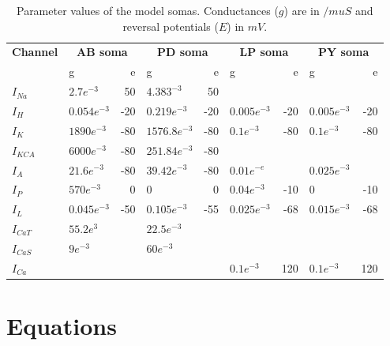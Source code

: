 \begin{table}[H]
	\centering
	\tiny
	\caption{Parameter values of the model somas. Conductances ($g$) are in $/mu S$ and reversal potentials ($E$) in $mV$.}
	\label{tab:addlabel}%
	\begin{tabular}{llrlrlrlr}
		\hline
		\bf Channel & \multicolumn{2}{c}{\bf AB soma} & \multicolumn{2}{c}{\bf PD soma} & \multicolumn{2}{c}{\bf LP soma} & \multicolumn{2}{c}{\bf PY soma} \\
		 & g & e & g & e & g & e & g & e \\
		\hline
		$I_{Na}$  & $2.7e^{-3}$ & 50 \vline& $4.383^{-3}$ & 50 \vline& \centering\textemdash & \textemdash \vline& \textemdash & \textemdash \\
		$I_{H}$  & $0.054e^{-3}$ & -20 \vline& $0.219e^{-3}$ & -20 \vline& $0.005e^{-3}$ & -20 \vline& $0.005e^{-3}$ & -20 \\
		$I_{K}$  & $1890e^{-3}$ & -80 \vline& $1576.8e^{-3}$ & -80 \vline& $0.1e^{-3}$ & -80  \vline & $0.1e^{-3}$ & -80 \\
		$I_{KCA}$ & $6000e^{-3}$ & -80 \vline& $251.84e^{-3}$ & -80 \vline& \centering\textemdash & \textemdash \vline& \centering\textemdash &  \textemdash \\
		$I_{A}$  & $21.6e^{-3}$ & -80 \vline& $39.42e^{-3}$ & -80 \vline& $0.01e^{-e}$ & \textemdash \vline& $0.025e^{-3}$ & \textemdash \\
		$I_{P}$  & $570e^{-3}$ & 0 \vline& 0  & 0  \vline& $0.04e^{-3}$ & -10 \vline& 0  & -10 \\
		$I_{L}$  & $0.045e^{-3}$ & -50 \vline& $0.105e^{-3}$ & -55 \vline& $0.025e^{-3}$ & -68 \vline& $0.015e^{-3}$ & -68 \\
		$I_{CaT}$ & $55.2e^{3}$ & \textemdash \vline& $22.5e^{-3}$ & \textemdash \vline& \centering\textemdash & \textemdash \vline& \textemdash & \textemdash \\
		$I_{CaS}$ & $9e^{-3}$ & \textemdash \vline& $60e^{-3}$ & \textemdash \vline& \centering\textemdash & \vline & \textemdash & \textemdash \\
		$I_{Ca}$ & \centering\textemdash & \textemdash \vline& \centering\textemdash & \textemdash \vline& $0.1e^{-3}$ & 120 \vline& $0.1e^{-3}$ & 120 \\
		\hline
	\end{tabular}%
\end{table}%

\section{Equations}

